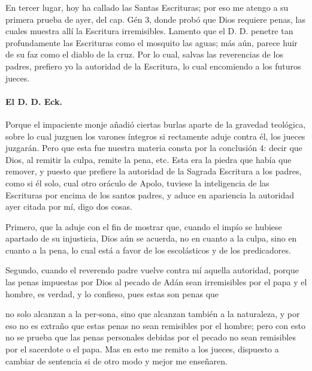 En tercer lugar, hoy ha callado las Santas Escrituras; por eso me atengo a su primera prueba de ayer, del cap. Gén 3, donde probó que Dios requiere penas, las cuales muestra allí la Escritura irremisibles. Lamento que el D. D. penetre tan profundamente las Escrituras como el mosquito las aguas; más aún, parece huir de su faz como el diablo de la cruz. Por lo cual, salvas las reverencias de los padres, prefiero yo la autoridad de la Escritura, lo cual encomiendo a los futuros jueces.

\paragraph*{El D. D. Eck.}

Porque el impaciente monje añadió ciertas burlas aparte de la gravedad teológica, sobre lo cual juzguen los varones íntegros si rectamente aduje contra él, los jueces juzgarán. Pero que esta fue nuestra materia consta por la conclusión 4: decir que Dios, al remitir la culpa, remite la pena, etc. Esta era la piedra que había que remover, y puesto que prefiere la autoridad de la Sagrada Escritura a los padres, como si él solo, cual otro oráculo de Apolo, tuviese la inteligencia de las Escrituras por encima de los santos padres, y aduce en apariencia la autoridad ayer citada por mí, digo dos cosas.

Primero, que la aduje con el fin de mostrar que, cuando el impío se hubiese apartado de su injusticia, Dios aún se acuerda, no en cuanto a la culpa, sino en cuanto a la pena, lo cual está a favor de los escolásticos y de los predicadores.

Segundo, cuando el reverendo padre vuelve contra mí aquella autoridad, porque las penas impuestas por Dios al pecado de Adán sean irremisibles por el papa y el hombre, es verdad, y lo confieso, pues estas son penas que

no solo alcanzan a la per-\marginpar{\small[383]}sona, sino que alcanzan también a la naturaleza, y por eso no es extraño que estas penas no sean remisibles por el hombre; pero con esto no se prueba que las penas personales debidas por el pecado no sean remisibles por el sacerdote o el papa. Mas en esto me remito a los jueces, dispuesto a cambiar de sentencia si de otro modo y mejor me enseñaren.


